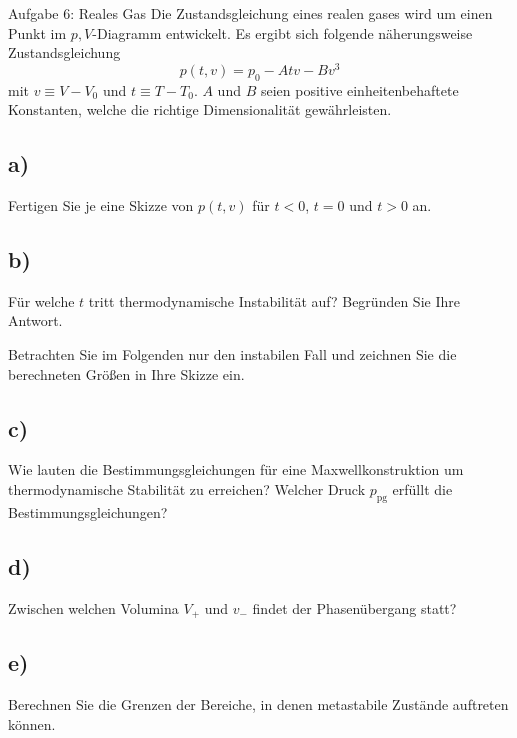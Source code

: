 \begin{aufgabe}{Aufgabe 6: Reales Gas}
    Die Zustandsgleichung eines realen gases wird um einen Punkt im $p,V$-Diagramm entwickelt.
    Es ergibt sich folgende näherungsweise Zustandsgleichung
    \[
        p(t,v) = p_0 - Atv - Bv^3
    \]
    mit $v \equiv V - V_0$ und $t \equiv T - T_0$. $A$ und $B$ seien positive einheitenbehaftete Konstanten, welche die richtige Dimensionalität gewährleisten.

    \subsection{a)}
    Fertigen Sie je eine Skizze von $p(t,v)$ für $t<0$, $t=0$ und $t>0$ an.

    \subsection{b)}
    Für welche $t$ tritt thermodynamische Instabilität auf?
    Begründen Sie Ihre Antwort.


    Betrachten Sie im Folgenden nur den instabilen Fall und zeichnen Sie die berechneten Größen in Ihre Skizze ein.

    \subsection{c)}
    Wie lauten die Bestimmungsgleichungen für eine Maxwellkonstruktion um thermodynamische Stabilität zu erreichen?
    Welcher Druck $p_\text{pg}$ erfüllt die Bestimmungsgleichungen?

    \subsection{d)}
    Zwischen welchen Volumina $V_+$ und $v_-$ findet der Phasenübergang statt?

    \subsection{e)}
    Berechnen Sie die Grenzen der Bereiche, in denen metastabile Zustände auftreten können.
\end{aufgabe}


